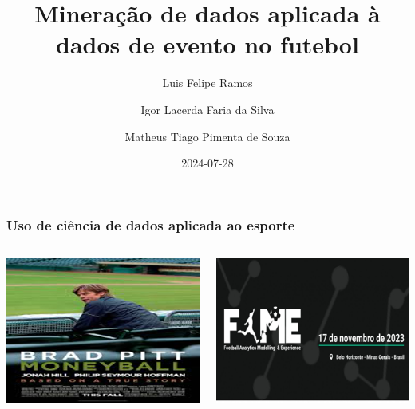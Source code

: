 \documentclass{beamer}
\title{Mineração de dados aplicada à dados de evento no futebol}
\author{Luis Felipe Ramos \and Igor Lacerda Faria da Silva \and Matheus Tiago Pimenta de Souza}
\date{2024-07-28}
\begin{document}
\frame{\titlepage}

\begin{frame}
\frametitle{Uso de ciência de dados aplicada ao esporte}

\begin{columns}
\begin{column}{0.5\textwidth}
\centering
\includegraphics[width=\linewidth]{moneyball.png}
\end{column}
\begin{column}{0.5\textwidth}
\centering
\includegraphics[width=\linewidth]{fame.png}
\end{column}
\end{columns}
\end{frame}
\end{document}
